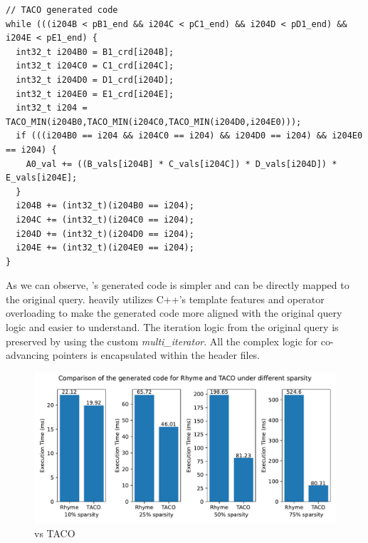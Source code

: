 \documentclass[acmsmall,nonacm]{acmart}\settopmatter{printfolios=true,printccs=false,printacmref=false}
\newcommand{\rhyme}{\text{Rhyme}\xspace}
\begin{document}
\vspace*{2mm}

\begin{lstlisting}[basicstyle=\ttfamily\footnotesize]
// TACO generated code
while (((i204B < pB1_end && i204C < pC1_end) && i204D < pD1_end) && i204E < pE1_end) {
  int32_t i204B0 = B1_crd[i204B];
  int32_t i204C0 = C1_crd[i204C];
  int32_t i204D0 = D1_crd[i204D];
  int32_t i204E0 = E1_crd[i204E];
  int32_t i204 = TACO_MIN(i204B0,TACO_MIN(i204C0,TACO_MIN(i204D0,i204E0)));
  if (((i204B0 == i204 && i204C0 == i204) && i204D0 == i204) && i204E0 == i204) {
    A0_val += ((B_vals[i204B] * C_vals[i204C]) * D_vals[i204D]) * E_vals[i204E];
  }
  i204B += (int32_t)(i204B0 == i204);
  i204C += (int32_t)(i204C0 == i204);
  i204D += (int32_t)(i204D0 == i204);
  i204E += (int32_t)(i204E0 == i204);
}
\end{lstlisting}
\vspace*{2mm}

As we can observe, \rhyme's generated code is simpler and can be directly mapped to the original query. \rhyme heavily utilizes C++'s template features and operator overloading to make the generated code more aligned with the original query logic and easier to understand. The iteration logic from the original query is preserved by using the custom \emph{multi\_iterator}. All the complex logic for co-advancing pointers is encapsulated within the header files.\par
\begin{figure}[H]
  \centering
      \includegraphics[scale=0.7]{figures/evaluation.pdf}
      \caption{\rhyme vs TACO}
      \label{evaluationpic}
  \end{figure}
\end{document}

